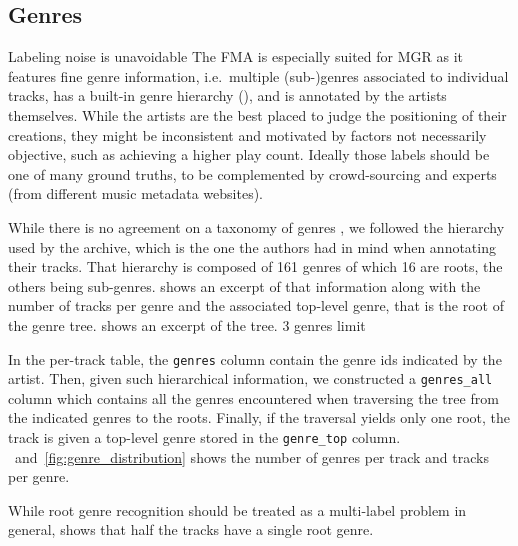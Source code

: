 \documentclass{article}
\newcommand{\todo}[1]{{\color{red} #1}}
\newcommand{\ngenres}{161 }
\begin{document}
\subsection{Genres}

\todo{Labeling noise is unavoidable}
The FMA is especially suited for MGR as it features fine genre information, i.e.\ multiple (sub-)genres associated to individual tracks, has a built-in genre hierarchy (), and is annotated by the artists themselves. While the artists are the best placed to judge the positioning of their creations, they might be inconsistent and motivated by factors not necessarily objective, such as achieving a higher play count. Ideally those labels should be one of many ground truths, to be complemented by crowd-sourcing and experts (from different music metadata websites).

While there is no agreement on a taxonomy of genres \cite{mir_review_genre}, we followed the hierarchy used by the archive, which is the one the authors had in mind when annotating their tracks. That hierarchy is composed of \ngenres genres of which 16 are roots, the others being sub-genres.  shows an excerpt of that information along with the number of tracks per genre and the associated top-level genre, that is the root of the genre tree.  shows an excerpt of the tree.
\todo{3 genres limit}

In the per-track table, the \texttt{genres} column contain the genre ids indicated by the artist. Then, given such hierarchical information, we constructed a \texttt{genres\_all} column which contains all the genres encountered when traversing the tree from the indicated genres to the roots. Finally, if the traversal yields only one root, the track is given a top-level genre stored in the \texttt{genre\_top} column.
~and~\ref{fig:genre_distribution} shows the number of genres per track and tracks per genre.

While root genre recognition should be treated as a multi-label problem in general,  shows that half the tracks have a single root genre.

\end{document}
